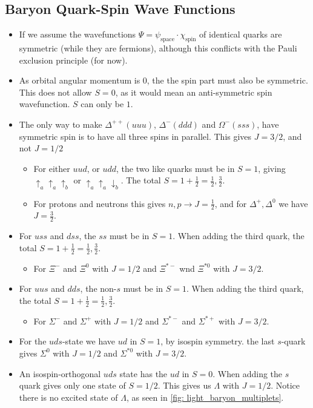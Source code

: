\subsection{Baryon Quark-Spin Wave Functions}
\begin{itemize}
    \item If we assume the wavefunctions $Ψ = ψ_{\text{space}}⋅ χ_{\text{spin}}$ of identical quarks are symmetric (while they are fermions), although this conflicts with the Pauli exclusion principle (for now). 
    \item As orbital angular momentum is 0, the the spin part must also be symmetric. This does not allow $S = 0$, as it would mean an anti-symmetric spin wavefunction. $S$ can only be $1$. 
    \item The only way to make $Δ^{++}(uuu)$, $Δ^{-}(ddd)$ and $Ω^{-}(sss)$, have symmetric spin is to have all three spins in parallel. This gives $J = 3 / 2$, and not $J = 1 / 2$
    \begin{itemize}
        \item For either $uud$, or $udd$, the two like quarks must be in $S = 1$, giving $↑_{a}↑_{a}↑_{b}$ or $↑_{a}↑_{a}↓_{b}$. The total $S = 1 + \frac{1}{2} = \frac{1}{2}, \frac{3}{2}$. 
        \item For protons and neutrons this gives $n,p → J = \frac{1}{2}$, and for $Δ^{+}, Δ^{0}$ we have $J = \frac{3}{2}$.
    \end{itemize}       
    \item For $uss$ and $dss$, the $ss$ must be in $S = 1$. When adding the third quark, the total $S = 1 + \frac{1}{2} = \frac{1}{2}, \frac{3}{2}$.
    \begin{itemize}
        \item For $Ξ^{-}$ and $Ξ^{0}$ with $J = 1 / 2$ and $Ξ^{*-}$ wnd $Ξ^{*0}$ with $J = 3 / 2$.
    \end{itemize}
    \item For $uus$ and $dds$, the non-$s$ must be in $S = 1$. When adding the third quark, the total $S = 1 + \frac{1}{2} = \frac{1}{2}, \frac{3}{2}$.
    \begin{itemize}
        \item For $Σ^{-}$ and $Σ^{+}$ with $J = 1 / 2$ and $Σ^{*-}$ and $Σ^{*+}$ with $J = 3 / 2$.
    \end{itemize} 
    \item For the $uds$-state we have $ud$ in $S = 1$, by isospin symmetry. the last $s$-quark gives $Σ^{0}$ with $J = 1 / 2$ and $Σ^{*0}$ with $J = 3 / 2$.
    \item An isospin-orthogonal $uds$ state has the $ud$ in $S = 0$. When adding the $s$ quark gives only one state of $S = 1 / 2$. This gives us $Λ$ with $J = 1 / 2$. Notice there is no excited state of $Λ$, as seen in \cref{fig: light_baryon_multiplets}.
\end{itemize}

